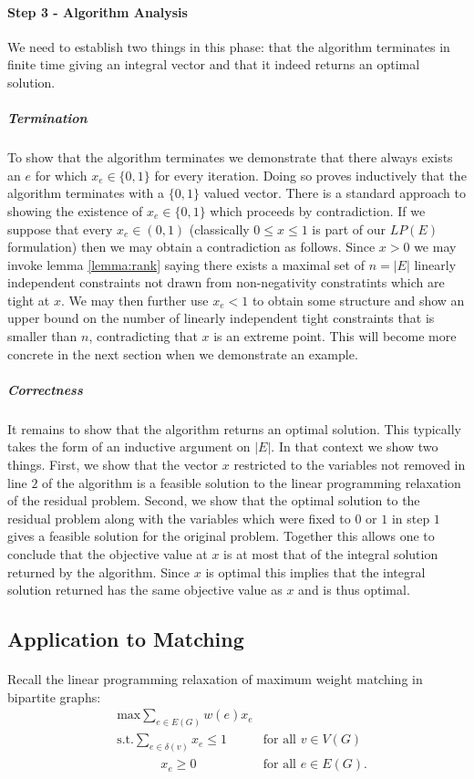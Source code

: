 \paragraph{Step 3 - Algorithm Analysis}
We need to establish two things in this phase: that the algorithm terminates in finite time giving an integral vector and that it indeed returns an optimal solution.
\subparagraph{Termination} To show that the algorithm terminates we demonstrate that there always exists an $e$ for which $x_e \in \{0,1\}$ for every iteration. Doing so proves inductively that the algorithm terminates with a $\{0,1\}$ valued vector. There is a standard approach to showing the existence of $x_e \in \{0,1\}$ which proceeds by contradiction. If we suppose that every $x_e \in (0,1)$ (classically $0\leq x \leq 1$ is part of our $LP(E)$ formulation) then we may obtain a contradiction as follows. Since $x>0$ we may invoke lemma \ref{lemma:rank} saying there exists a maximal set of $n=|E|$ linearly independent constraints not drawn from non-negativity constratints which are tight at $x$. We may then further use $x_e < 1$ to obtain some structure and show an upper bound on the number of linearly independent tight constraints that is smaller than $n$, contradicting that $x$ is an extreme point. This will become more concrete in the next section when we demonstrate an example.
\subparagraph{Correctness} It remains to show that the algorithm returns an optimal solution. This typically takes the form of an inductive argument on $|E|$. In that context  we show two things. First, we show that the vector $x$ restricted to the variables not removed in line $2$ of the algorithm is a feasible solution to the linear programming relaxation of the residual problem. Second, we show that the optimal solution to the residual problem along with the variables which were fixed to $0$ or $1$ in step $1$ gives a feasible solution for the original problem. Together this allows one to conclude that the objective value at $x$ is at most that of the integral solution returned by the algorithm. Since $x$ is optimal this implies that the integral solution returned has the same objective value as $x$ and is thus optimal.
\subsection{Application to Matching}\label{subsec:irapp}
\paragraph{}
Recall the linear programming relaxation of maximum weight matching in bipartite graphs:
\begin{align*}
	&\text{max} \sum_{e \in E(G)} w(e) x_e \\
	&\text{s.t.} \sum_{e \in \delta(v)} x_e \leq 1 &\text{for all $v \in V(G)$} \\
	&\quad\quad\quad\ \ x_e \geq 0 &\text{for all $e \in E(G)$.}
\end{align*}
